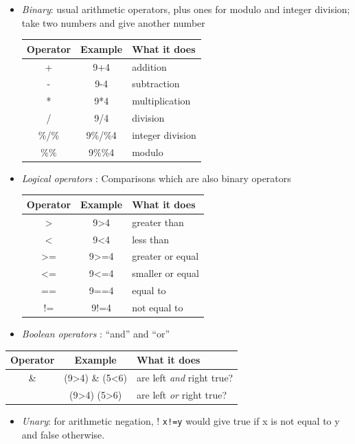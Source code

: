 \documentclass[
]{gitbook}
\providecommand{\tightlist}{%
  \setlength{\itemsep}{0pt}\setlength{\parskip}{0pt}}
\begin{document}
\begin{itemize}
\item
  \emph{Binary}: usual arithmetic operators, plus ones for modulo and integer division; take two numbers and give another number

  \begin{longtable}[]{@{}ccl@{}}
  \toprule()
  Operator & Example & What it does \\
  \midrule()
  \endhead
  + & 9+4 & addition \\
  - & 9-4 & subtraction \\
  * & 9*4 & multiplication \\
  / & 9/4 & division \\
  \%/\% & 9\%/\%4 & integer division \\
  \%\% & 9\%\%4 & modulo \\
  \bottomrule()
  \end{longtable}
\item
  \emph{Logical operators} : Comparisons which are also binary operators

  \begin{longtable}[]{@{}ccl@{}}
  \toprule()
  Operator & Example & What it does \\
  \midrule()
  \endhead
  \textgreater{} & 9\textgreater4 & greater than \\
  \textless{} & 9\textless4 & less than \\
  \textgreater= & 9\textgreater=4 & greater or equal \\
  \textless= & 9\textless=4 & smaller or equal \\
  == & 9==4 & equal to \\
  != & 9!=4 & not equal to \\
  \bottomrule()
  \end{longtable}
\item
  \emph{Boolean operators} : ``and'' and ``or''
\end{itemize}

\begin{longtable}[]{@{}ccl@{}}
\toprule()
Operator & Example & What it does \\
\midrule()
\endhead
\& & (9\textgreater4) \& (5\textless6) & are left \emph{and} right true? \\
\textbar{} & (9\textgreater4) \textbar{} (5\textgreater6) & are left \emph{or} right true? \\
\bottomrule()
\end{longtable}

\begin{itemize}
\tightlist
\item
  \emph{Unary}: for arithmetic negation, ! \texttt{x!=y} would give true if x is not equal to y and false otherwise.
\end{itemize}
\end{document}
